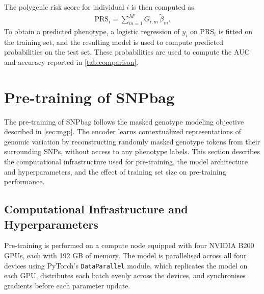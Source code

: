 The polygenic risk score for individual $i$ is then computed as
\begin{align*}
    \text{PRS}_i = \sum_{m=1}^{M'} G_{i,m}\, \tilde{\beta}_m.
\end{align*}
To obtain a predicted phenotype, a logistic regression of $y_i$ on
$\text{PRS}_i$ is fitted on the training set, and the resulting model is
used to compute predicted probabilities on the test set. These
probabilities are used to compute the AUC and accuracy reported in
\autoref{tab:comparison}.

\section{Pre-training of SNPbag}
\label{sec:app_pretrain}

The pre-training of SNPbag follows the masked genotype modeling objective described in \autoref{sec:mgp}. The encoder learns contextualized representations of genomic variation by reconstructing randomly masked genotype tokens from their surrounding SNPs, without access to any phenotype labels. This section describes the computational infrastructure used for pre-training, the model architecture and hyperparameters, and the effect of training set size on pre-training performance.

\subsection{Computational Infrastructure and Hyperparameters}
\label{sec:app_compute}

Pre-training is performed on a compute node equipped with four NVIDIA B200 GPUs, each with 192 GB of memory. The model is parallelised across all four devices using PyTorch's \texttt{DataParallel} module, which replicates the model on each GPU, distributes each batch evenly across the devices, and synchronises gradients before each parameter update.

